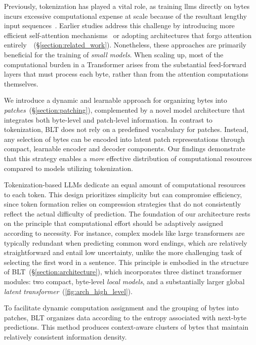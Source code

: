 Previously, tokenization has played a vital role, as training llms directly on bytes incurs excessive computational expense at scale because of the resultant lengthy input sequences~\citep{xue2022byt5}. Earlier studies address this challenge by introducing more efficient self-attention mechanisms~\citep{el2020characterbert, clark2022canine} or adopting architectures that forgo attention entirely~\citep{wang2024mambabyte}~(\S\ref{section:related_work}). Nonetheless, these approaches are primarily beneficial for the training of \textit{small models}. When scaling up, most of the computational burden in a Transformer arises from the substantial feed-forward layers that must process each byte, rather than from the attention computations themselves.

We introduce a dynamic and learnable approach for organizing bytes into \textit{patches}~(\S\ref{section:patching}), complemented by a novel model architecture that integrates both byte-level and patch-level information. In contrast to tokenization, {\textsc BLT} does not rely on a predefined vocabulary for patches. Instead, any selection of bytes can be encoded into latent patch representations through compact, learnable encoder and decoder components. Our findings demonstrate that this strategy enables a \textit{more} effective distribution of computational resources compared to models utilizing tokenization.

Tokenization-based LLMs dedicate an equal amount of computational resources to each token. This design prioritizes simplicity but can compromise efficiency, since token formation relies on compression strategies that do not consistently reflect the actual difficulty of prediction. The foundation of our architecture rests on the principle that computational effort should be adaptively assigned according to necessity. For instance, complex models like large transformers are typically redundant when predicting common word endings, which are relatively straightforward and entail low uncertainty, unlike the more challenging task of selecting the first word in a sentence. This principle is embodied in the structure of {\textsc BLT}~(\S\ref{section:architecture}), which incorporates three distinct transformer modules: two compact, byte-level \textit{local models}, and a substantially larger global \textit{latent transformer}~(\autoref{fig:arch_high_level}). 

To facilitate dynamic computation assignment and the grouping of bytes into patches, {\textsc BLT} organizes data according to the entropy associated with next-byte predictions. This method produces context-aware clusters of bytes that maintain relatively consistent information density.

